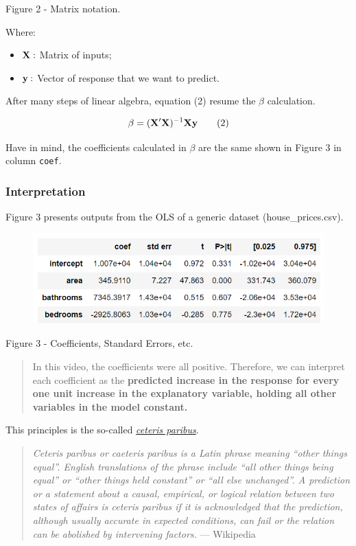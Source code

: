 \documentclass[]{book}
\providecommand{\tightlist}{%
  \setlength{\itemsep}{0pt}\setlength{\parskip}{0pt}}
\begin{document}
Figure 2 - Matrix notation.

Where:

\begin{itemize}
\tightlist
\item
  \(\bold X:\) Matrix of inputs;
\item
  \(\bold y:\) Vector of response that we want to predict.
\end{itemize}

After many steps of linear algebra, equation (2) resume the \(\beta\)
calculation.

\[ \beta = (\bold X' \bold X)^{-1} \bold X \bold y \tag{2}\]

Have in mind, the coefficients calculated in \(\beta\) are the same
shown in Figure 3 in column \texttt{coef}.

\subsubsection*{Interpretation}\label{interpretation}

Figure 3 presents outputs from the OLS of a generic dataset
(house\_prices.csv).

\begin{figure}
\centering
\includegraphics{01-img/c4_l15_03.png}
\caption{}
\end{figure}

Figure 3 - Coefficients, Standard Errors, etc.

\begin{quote}
In this video, the coefficients were all positive. Therefore, we can
interpret each coefficient as the \textbf{predicted increase in the
response for every one unit increase in the explanatory variable,
holding all other variables in the model constant.}
\end{quote}

This principles is the so-called
\href{https://en.wikipedia.org/wiki/Ceteris_paribus}{\emph{ceteris
paribus}}.

\begin{quote}
\emph{Ceteris paribus or caeteris paribus is a Latin phrase meaning
``other things equal''. English translations of the phrase include ``all
other things being equal'' or ``other things held constant'' or ``all
else unchanged''. A prediction or a statement about a causal, empirical,
or logical relation between two states of affairs is ceteris paribus if
it is acknowledged that the prediction, although usually accurate in
expected conditions, can fail or the relation can be abolished by
intervening factors.} --- Wikipedia
\end{quote}
\end{document}
